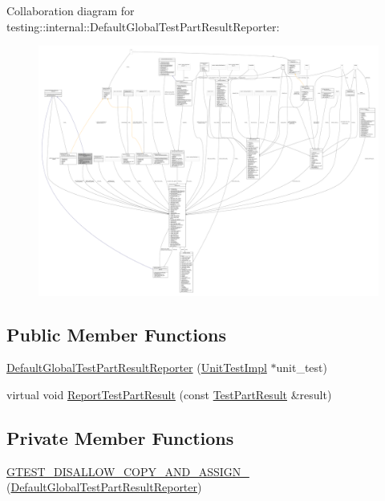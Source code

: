 Collaboration diagram for testing\+:\+:internal\+:\+:Default\+Global\+Test\+Part\+Result\+Reporter\+:
\nopagebreak
\begin{figure}[H]
\begin{center}
\leavevmode
\includegraphics[width=350pt]{classtesting_1_1internal_1_1DefaultGlobalTestPartResultReporter__coll__graph}
\end{center}
\end{figure}
\subsection*{Public Member Functions}
\begin{DoxyCompactItemize}
\item 
\hyperlink{classtesting_1_1internal_1_1DefaultGlobalTestPartResultReporter_a3900ea7f34b34afd48c7d1d0312a1488}{Default\+Global\+Test\+Part\+Result\+Reporter} (\hyperlink{classtesting_1_1internal_1_1UnitTestImpl}{Unit\+Test\+Impl} $\ast$unit\+\_\+test)
\item 
virtual void \hyperlink{classtesting_1_1internal_1_1DefaultGlobalTestPartResultReporter_a6081576a23b964cfecab1e424d8044fc}{Report\+Test\+Part\+Result} (const \hyperlink{classtesting_1_1TestPartResult}{Test\+Part\+Result} \&result)
\end{DoxyCompactItemize}
\subsection*{Private Member Functions}
\begin{DoxyCompactItemize}
\item 
\hyperlink{classtesting_1_1internal_1_1DefaultGlobalTestPartResultReporter_ae7ea4be351ec342fe323546d9e2c00d9}{G\+T\+E\+S\+T\+\_\+\+D\+I\+S\+A\+L\+L\+O\+W\+\_\+\+C\+O\+P\+Y\+\_\+\+A\+N\+D\+\_\+\+A\+S\+S\+I\+G\+N\+\_\+} (\hyperlink{classtesting_1_1internal_1_1DefaultGlobalTestPartResultReporter}{Default\+Global\+Test\+Part\+Result\+Reporter})
\end{DoxyCompactItemize}
